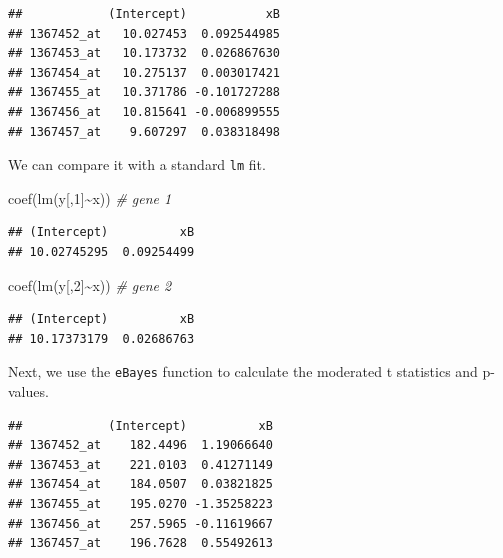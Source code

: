 \documentclass[
]{book}
\newenvironment{Shaded}{\begin{snugshade}}{\end{snugshade}}
\newcommand{\CommentTok}[1]{\textcolor[rgb]{0.56,0.35,0.01}{\textit{#1}}}
\newcommand{\DecValTok}[1]{\textcolor[rgb]{0.00,0.00,0.81}{#1}}
\newcommand{\FunctionTok}[1]{\textcolor[rgb]{0.00,0.00,0.00}{#1}}
\newcommand{\NormalTok}[1]{#1}
\newcommand{\OtherTok}[1]{\textcolor[rgb]{0.56,0.35,0.01}{#1}}
\newcommand{\SpecialCharTok}[1]{\textcolor[rgb]{0.00,0.00,0.00}{#1}}
\begin{document}
\begin{verbatim}
##            (Intercept)           xB
## 1367452_at   10.027453  0.092544985
## 1367453_at   10.173732  0.026867630
## 1367454_at   10.275137  0.003017421
## 1367455_at   10.371786 -0.101727288
## 1367456_at   10.815641 -0.006899555
## 1367457_at    9.607297  0.038318498
\end{verbatim}

We can compare it with a standard \texttt{lm} fit.

\begin{Shaded}
\begin{Highlighting}[]
\FunctionTok{coef}\NormalTok{(}\FunctionTok{lm}\NormalTok{(y[,}\DecValTok{1}\NormalTok{]}\SpecialCharTok{\textasciitilde{}}\NormalTok{x)) }\CommentTok{\# gene 1}
\end{Highlighting}
\end{Shaded}

\begin{verbatim}
## (Intercept)          xB 
## 10.02745295  0.09254499
\end{verbatim}

\begin{Shaded}
\begin{Highlighting}[]
\FunctionTok{coef}\NormalTok{(}\FunctionTok{lm}\NormalTok{(y[,}\DecValTok{2}\NormalTok{]}\SpecialCharTok{\textasciitilde{}}\NormalTok{x)) }\CommentTok{\# gene 2}
\end{Highlighting}
\end{Shaded}

\begin{verbatim}
## (Intercept)          xB 
## 10.17373179  0.02686763
\end{verbatim}

Next, we use the \texttt{eBayes} function to calculate the moderated t statistics and p-values.

\begin{Shaded}
\end{Shaded}

\begin{verbatim}
##            (Intercept)          xB
## 1367452_at    182.4496  1.19066640
## 1367453_at    221.0103  0.41271149
## 1367454_at    184.0507  0.03821825
## 1367455_at    195.0270 -1.35258223
## 1367456_at    257.5965 -0.11619667
## 1367457_at    196.7628  0.55492613
\end{verbatim}
\end{document}
